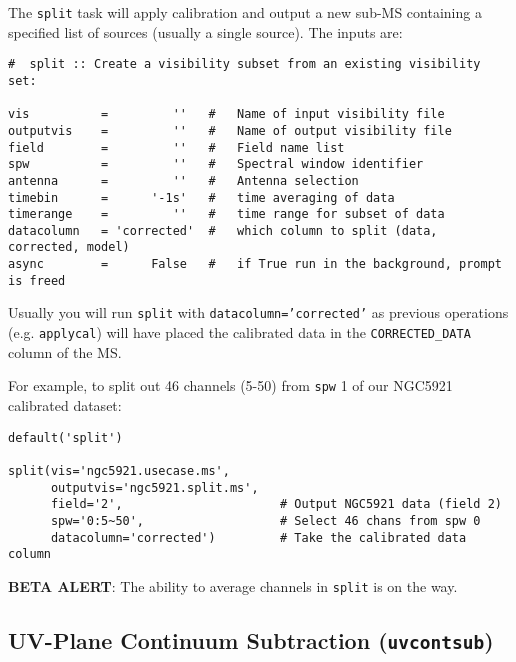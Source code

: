 The {\tt split} task will apply calibration and output a new sub-MS
containing a specified list of sources (usually a single source).
The inputs are:
\small
\begin{verbatim}
#  split :: Create a visibility subset from an existing visibility set:

vis          =         ''   #   Name of input visibility file
outputvis    =         ''   #   Name of output visibility file
field        =         ''   #   Field name list
spw          =         ''   #   Spectral window identifier
antenna      =         ''   #   Antenna selection
timebin      =      '-1s'   #   time averaging of data
timerange    =         ''   #   time range for subset of data
datacolumn   = 'corrected'  #   which column to split (data, corrected, model)
async        =      False   #   if True run in the background, prompt is freed
\end{verbatim}
\normalsize
Usually you will run {\tt split} with {\tt datacolumn='corrected'} as
previous operations (e.g. {\tt applycal}) will have placed the
calibrated data in the {\tt CORRECTED\_DATA} column of the MS.

For example, to split out 46 channels (5-50) from {\tt spw} 1 of
our NGC5921 calibrated dataset:
\small
\begin{verbatim}
default('split')

split(vis='ngc5921.usecase.ms',       
      outputvis='ngc5921.split.ms',    
      field='2',                      # Output NGC5921 data (field 2)
      spw='0:5~50',                   # Select 46 chans from spw 0
      datacolumn='corrected')         # Take the calibrated data column
\end{verbatim}
\normalsize

{\bf BETA ALERT}: The ability to average channels in {\tt split} is
on the way.

\subsection{UV-Plane Continuum Subtraction ({\tt uvcontsub})}
\label{section:cal.other.uvcontsub}

